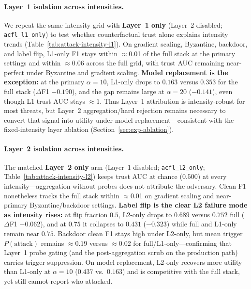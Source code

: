 \paragraph{Layer~1 isolation across intensities.}
We repeat the same intensity grid with \textbf{Layer~1 only} (Layer~2 disabled; \texttt{acfl\_l1\_only}) to test whether counterfactual trust alone explains intensity trends (Table~\ref{tab:attack-intensity-l1}).
On gradient scaling, Byzantine, backdoor, and label flip, L1-only F1 stays within $\approx$0.01 of the full stack at the primary settings and within $\approx$0.06 across the full grid, with trust AUC remaining near-perfect under Byzantine and gradient scaling.
\textbf{Model replacement is the exception:} at the primary $\alpha{=}10$, L1-only drops to $0.163$ versus $0.353$ for the full stack ($\Delta$F1 $-0.190$), and the gap remains large at $\alpha{=}20$ ($-0.141$), even though L1 trust AUC stays $\approx 1$.
Thus Layer~1 attribution is intensity-robust for most threats, but Layer~2 aggregation/hard rejection remains necessary to convert that signal into utility under model replacement---consistent with the fixed-intensity layer ablation (Section~\ref{sec:exp-ablation}).

\paragraph{Layer~2 isolation across intensities.}
The matched \textbf{Layer~2 only} arm (Layer~1 disabled; \texttt{acfl\_l2\_only}; Table~\ref{tab:attack-intensity-l2}) keeps trust AUC at chance ($0.500$) at every intensity---aggregation without probes does not attribute the adversary.
Clean F1 nonetheless tracks the full stack within $\approx$0.01 on gradient scaling and near-primary Byzantine/backdoor settings.
\textbf{Label flip is the clear L2 failure mode as intensity rises:} at flip fraction $0.5$, L2-only drops to $0.689$ versus $0.752$ full ($\Delta$F1 $-0.062$), and at $0.75$ it collapses to $0.431$ ($-0.323$) while full and L1-only remain near $0.75$.
Backdoor clean F1 stays high under L2-only, but mean trigger $P(\text{attack})$ remains $\approx 0.19$ versus $\approx 0.02$ for full/L1-only---confirming that Layer~1 probe gating (and the post-aggregation scrub on the production path) carries trigger suppression.
On model replacement, L2-only recovers more utility than L1-only at $\alpha{=}10$ ($0.437$ vs.\ $0.163$) and is competitive with the full stack, yet still cannot report who attacked.


